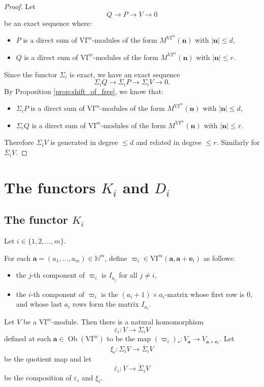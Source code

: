\documentclass{amsart}
\numberwithin{equation}{section}
\DeclareMathOperator{\Ob}{Ob}
\newcommand{\N}{{\mathbb{N}}}
\newcommand{\VI}{{\mathrm{VI}}}
\newcommand{\SSigma}{{\overline{\Sigma}}}
\begin{document}
\begin{proof}
   Let 
   \[ Q \to P \to V \to 0 \]
   be an exact sequence where: 
   \begin{itemize}
      \item $P$ is a direct sum of $\VI^m$-modules of the form $M^{\VI^m}(\mathbf{n})$ with $|\mathbf{n}|\leqslant d$, 
      \item $Q$ is a direct sum of $\VI^m$-modules of the form $M^{\VI^m}(\mathbf{n})$ with $|\mathbf{n}|\leqslant r$. 
   \end{itemize}
   Since the functor $\Sigma_i$ is exact, we have an exact sequence 
   \[ \Sigma_i Q \to \Sigma_i P \to \Sigma_i V \to 0. \]
   By Proposition \ref{prop:shift_of_free}, we know that:
   \begin{itemize}
      \item $\Sigma_i P$ is a direct sum of $\VI^m$-modules of the form $M^{\VI^m}(\mathbf{n})$ with $|\mathbf{n}|\leqslant d$, 
      \item $\Sigma_i Q$ is a direct sum of $\VI^m$-modules of the form $M^{\VI^m}(\mathbf{n})$ with $|\mathbf{n}|\leqslant r$. 
   \end{itemize}
   Therefore $\Sigma_i V$ is generated in degree $\leqslant d$ and related in degree $\leqslant r$. Similarly for $\SSigma_i V$. 
\end{proof}


\section{The functors \(K_i\) and \(D_i\)} \label{sec: the functors Ki and Di}


\subsection{The functor $K_i$}
Let $i\in \{1, 2, \ldots, m\}$. 

For each $\mathbf{a}=(a_1, \ldots, a_m)\in \N^m$, define $\varpi_i\in \VI^m(\mathbf{a},\mathbf{a}+\mathbf{e}_i)$ as follows: 
\begin{itemize}
   \item the $j$-th component of $\varpi_i$ is $I_{a_j}$ for all $j\neq i$,
   \item the $i$-th component of $\varpi_i$ is the $(a_i+1)\times a_i$-matrix whose first row is $0$, and whose last $a_i$ rows form the matrix $I_{a_i}$.
\end{itemize}  

Let $V$ be a $\VI^m$-module. Then there is a natural homomorphism 
\[ \varepsilon_i: V\to \Sigma_i V \]
defined at each $\mathbf{a}\in \Ob(\VI^m)$ to be the map $(\varpi_i)_*: V_{\mathbf{a}} \to V_{\mathbf{a}+\mathbf{e}_i}$. Let 
\[ \xi_i: \Sigma_i V \to \SSigma_i V \] 
be the quotient map and let 
\[ \overline\varepsilon_i: V\to \SSigma_i V \]
be the composition of $\varepsilon_i$ and $\xi_i$.
\end{document}
